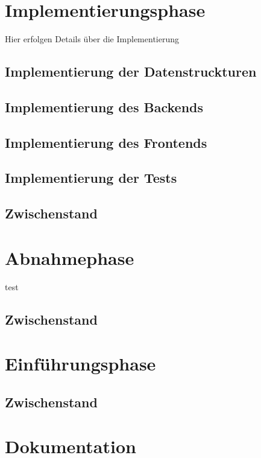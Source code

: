 \documentclass[12pt, xcolor=dvipsnames]{scrartcl}
\begin{document}
\section{Implementierungsphase}

	Hier erfolgen Details über die Implementierung

\subsection{Implementierung der Datenstruckturen}

\subsection{Implementierung des Backends}

\subsection{Implementierung des Frontends}

\subsection{Implementierung der Tests}

\subsection{Zwischenstand}

\section{Abnahmephase}
	test

\subsection{Zwischenstand}

\section{Einführungsphase}

\subsection{Zwischenstand}


\section{Dokumentation}
\end{document}
